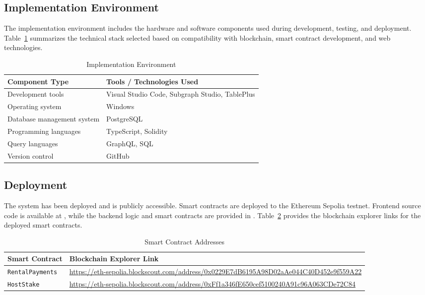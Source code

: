 \documentclass[conference]{IEEEtran}
\begin{document}
\subsection{Implementation Environment}
\label{subsec:environment}
The implementation environment includes the hardware and software components used during development, testing, and deployment. Table~\ref{tab:environment} summarizes the technical stack selected based on compatibility with blockchain, smart contract development, and web technologies.

\begin{table}[ht]
\caption{Implementation Environment}
\label{tab:environment}
\small
\begin{tabularx}{\columnwidth}{|p{3.5cm}|X|}
\hline
\textbf{Component Type} & \textbf{Tools / Technologies Used} \\
\hline
Development tools & Visual Studio Code, Subgraph Studio, TablePlus \\
\hline
Operating system & Windows \\
\hline
Database management system & PostgreSQL \\
\hline
Programming languages & TypeScript, Solidity \\
\hline
Query languages & GraphQL, SQL \\
\hline
Version control & GitHub \\
\hline
\end{tabularx}
\end{table}

\subsection{Deployment}
\label{subsec:deployment}
The system has been deployed and is publicly accessible. Smart contracts are deployed to the Ethereum Sepolia testnet. Frontend source code is available at \cite{ta-frontend}, while the backend logic and smart contracts are provided in \cite{ta-backend, ta-smartcontract}. Table~\ref{tab:deployment} provides the blockchain explorer links for the deployed smart contracts.

\begin{table}[ht]
\caption{Smart Contract Addresses}
\label{tab:deployment}
\small
\begin{tabularx}{\columnwidth}{|p{2.8cm}|X|}
\hline
\textbf{Smart Contract} & \textbf{Blockchain Explorer Link} \\
\hline
\texttt{RentalPayments} & \url{https://eth-sepolia.blockscout.com/address/0x0229E7dB6195A98D02aAe044C40D452e9f559A22} \\
\hline
\texttt{HostStake} & \url{https://eth-sepolia.blockscout.com/address/0xFf1a346fE650cef5100240A91c96A063CDe72C84} \\
\hline
\end{tabularx}
\end{table}
\end{document}
